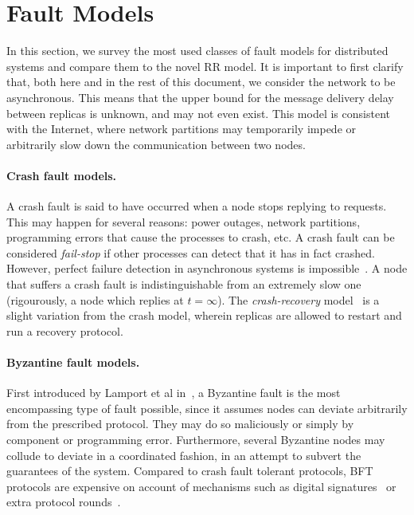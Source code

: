 \label{chap:related}
\cleardoublepage{}

\section{Fault Models}\label{sec:related_fault_models}

In this section, we survey the most used classes of fault models
for distributed systems and compare them to the novel
\ac{RR} model. It is important to first clarify that, both
here and in the rest of this document, we consider the network to
be asynchronous. This means that the upper bound for the message
delivery delay between replicas is unknown, and may not even
exist. This model is consistent with the Internet, where network
partitions may temporarily impede or arbitrarily slow down the
communication between two nodes.

\paragraph{Crash fault models.} A crash fault is said to have
occurred when a node stops replying to requests. This may happen
for several reasons: power outages, network
partitions, programming errors that
cause the processes to crash, etc. A crash fault can be
considered \emph{fail-stop} if other processes can detect that it
has in fact crashed. However, perfect failure detection in asynchronous
systems is impossible~\cite{perfect-failure-impossible}. A node that
suffers a crash fault is indistinguishable from an extremely slow
one~\cite{polynomial-communication} (rigourously, a node which replies at $t = \infty$).  The
\emph{crash-recovery}
model~\cite{consensus-recovery,crash-recovery} is a slight variation from the crash
model, wherein replicas are allowed to restart and run a recovery
protocol.

\paragraph{Byzantine fault models.}
First introduced by Lamport et al in~\cite{lamport:byzgenerals},
a Byzantine fault is the most encompassing type of fault
possible, since it assumes nodes can deviate arbitrarily from the
prescribed protocol. They may do so maliciously or simply by component
or programming error. Furthermore, several Byzantine nodes may
collude to deviate in a coordinated fashion, in an attempt to
subvert the guarantees of the system. Compared to crash fault
tolerant protocols, \ac{BFT} protocols are expensive on account of
mechanisms such as digital signatures~\cite{bqs} or extra protocol
rounds~\cite{pbft}.

